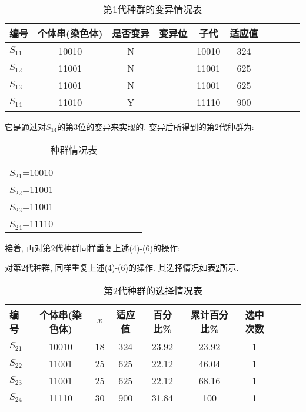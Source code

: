 {%
\begin{table} [H]
\caption{第1代种群的变异情况表}
\begin{center}
\begin{tabular} {lccccccccc}
  \hline
编号&	个体串(染色体)	&是否变异&	变异位	&子代&	适应值\\
  \hline
$S_{11}$&	10010&	N&		&10010&	324\\
$S_{12}$&	11001&	N&		&11001&	625\\
$S_{13}$&	11001&	N&		&11001&	625\\
$S_{14}$&	11010&	Y&	    &11110&	900\\
\hline
\end{tabular}
\end{center}
\label{AI_table2019112809}
\end{table}
它是通过对$S_{14}$的第3位的变异来实现的. 变异后所得到的第2代种群为:
\begin{table} [H]
\caption{种群情况表}
\begin{center}
\begin{tabular} {lccccccccc}
\hline
$S_{21}$=10010\\
$S_{22}$=11001\\
$S_{23}$=11001\\
$S_{24}$=11110\\
\hline
\end{tabular}
\end{center}
\end{table}
接着, 再对第2代种群同样重复上述(4)-(6)的操作:

对第2代种群, 同样重复上述(4)-(6)的操作. 其选择情况如表\ref{AI_table2019112810}所示.

\begin{table} [H]
\caption{第2代种群的选择情况表}
\begin{center}
\begin{tabular} {lccccccccc}
  \hline
编号	&个体串(染色体)&	$x$	&适应值	&百分比\%	&累计百分比\%	&选中次数\\
  \hline
$S_{21}$&	10010&	18	&324	&23.92	&23.92	&1\\
$S_{22}$&11001&	25	&625	&22.12	&46.04	&1\\
$S_{23}$	&11001&	25	&625	&22.12	&68.16	&1\\
$S_{24}$ &11110 &30	&900	&31.84&	100&1\\
\hline
\end{tabular}
\end{center}
\label{AI_table2019112810}
\end{table}

}
